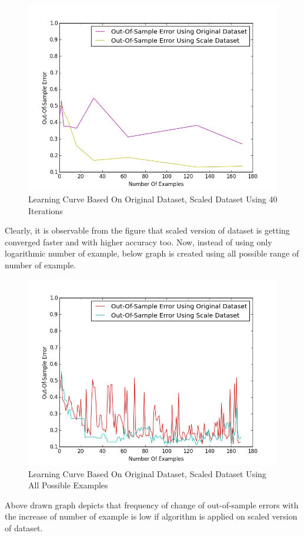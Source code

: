 \documentclass{article}
\begin{document}
\begin{figure}[H]
\centering
\includegraphics[width=5in]{images/40Iter_Normalized.jpeg}
\caption{Learning Curve Based On Original Dataset, Scaled Dataset Using 40 Iterations}
\label{2.5 Learning Curve}
  
\end{figure}
\par Clearly, it is observable from the figure that scaled version of dataset is getting converged faster and with higher accuracy too. Now, instead of using only logarithmic number of example, below graph is created using all possible range of number of example.
\begin{figure}[H]
\centering
\includegraphics[width=6in]{images/LearningCurveForNormalizationVsOriginal.jpeg}
\caption{Learning Curve Based On Original Dataset, Scaled Dataset Using All Possible Examples}
\label{3. Learning Curve}
  
\end{figure}
\par Above drawn graph depicts that frequency of change of out-of-sample errors with the increase of number of example is low if algorithm is applied on scaled version of dataset.
\end{document}
